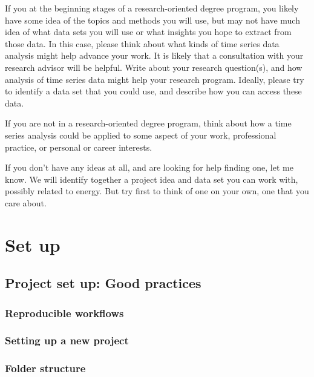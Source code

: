 \documentclass[
]{book}
\begin{document}
If you at the beginning stages of a research-oriented degree program, you likely have some idea of the topics and methods you will use, but may not have much idea of what data sets you will use or what insights you hope to extract from those data. In this case, please think about what kinds of time series data analysis might help advance your work. It is likely that a consultation with your research advisor will be helpful. Write about your research question(s), and how analysis of time series data might help your research program. Ideally, please try to identify a data set that you could use, and describe how you can access these data.

If you are not in a research-oriented degree program, think about how a time series analysis could be applied to some aspect of your work, professional practice, or personal or career interests.

If you don't have any ideas at all, and are looking for help finding one, let me know. We will identify together a project idea and data set you can work with, possibly related to energy. But try first to think of one on your own, one that you care about.

\hypertarget{part-set-up}{%
\part{Set up}\label{part-set-up}}

\hypertarget{project-set-up-good-practices}{%
\chapter{Project set up: Good practices}\label{project-set-up-good-practices}}

\hypertarget{reproducible-workflows}{%
\section{Reproducible workflows}\label{reproducible-workflows}}

\hypertarget{setting-up-a-new-project}{%
\section{Setting up a new project}\label{setting-up-a-new-project}}

\hypertarget{folder-structure}{%
\section{Folder structure}\label{folder-structure}}
\end{document}
